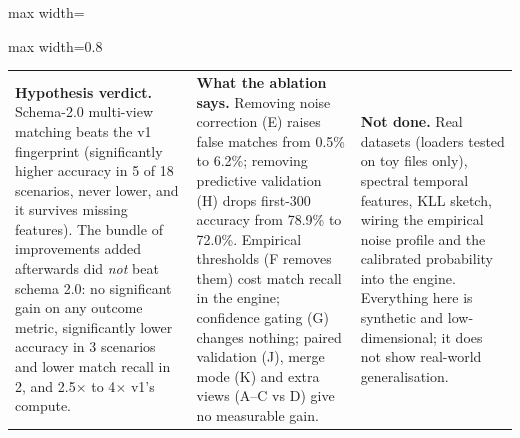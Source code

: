 \documentclass[10pt]{article}
\begin{document}
\begin{center}\begin{adjustbox}{max width=\textwidth}

\end{adjustbox}\end{center}
\vspace{8pt}
\begin{center}\begin{adjustbox}{max width=0.8\textwidth}

\end{adjustbox}\end{center}
\vfill
\begin{tabular}{@{}p{12cm}p{12cm}p{12cm}@{}}
\textbf{Hypothesis verdict.} Schema-2.0 multi-view matching beats the v1 fingerprint (significantly higher accuracy in 5 of 18 scenarios, never lower, and it survives missing features). The bundle of improvements added afterwards did \emph{not} beat schema 2.0: no significant gain on any outcome metric, significantly lower accuracy in 3 scenarios and lower match recall in 2, and 2.5$\times$ to 4$\times$ v1's compute. &
\textbf{What the ablation says.} Removing noise correction (E) raises false matches from 0.5\% to 6.2\%; removing predictive validation (H) drops first-300 accuracy from 78.9\% to 72.0\%. Empirical thresholds (F removes them) cost match recall in the engine; confidence gating (G) changes nothing; paired validation (J), merge mode (K) and extra views (A--C vs D) give no measurable gain. &
\textbf{Not done.} Real datasets (loaders tested on toy files only), spectral temporal features, KLL sketch, wiring the empirical noise profile and the calibrated probability into the engine. Everything here is synthetic and low-dimensional; it does not show real-world generalisation.
\end{tabular}
\clearpage
\end{document}

